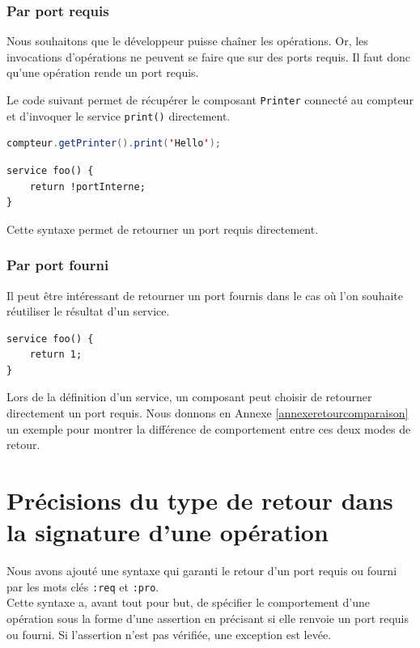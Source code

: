 \documentclass[11pt,a4paper,openany,oneside]{book}
\begin{document}
\subsubsection{Par port requis}
Nous souhaitons que le développeur puisse chaîner les opérations. Or, les invocations d'opérations ne peuvent se faire que sur des ports requis. Il faut donc qu'une opération rende un port requis.

Le code suivant permet de récupérer le composant \texttt{Printer} connecté au compteur et d'invoquer le service \texttt{print()} directement.
\begin{lstlisting}[language=JAVA, frame=single, caption=Syntaxe d'un chaînage d'invocation en COMPO]
compteur.getPrinter().print('Hello');
\end{lstlisting}



\begin{lstlisting}[language=COMPO, frame=single, caption=Syntaxe de retour d'un port requis en COMPO]
service foo() {
    return !portInterne;
}
\end{lstlisting}

Cette syntaxe permet de retourner un port requis directement.


\subsubsection{Par port fourni}
Il peut être intéressant de retourner un port fournis dans le cas où l'on souhaite réutiliser le résultat d'un service.


\begin{lstlisting}[language=COMPO, frame=single, caption=Syntaxe de retour d'un port founis en COMPO]
service foo() {
    return 1;
}
\end{lstlisting}

Lors de la définition d'un service, un composant peut choisir de retourner directement un port requis.
Nous donnons en Annexe \ref{annexeretourcomparaison} un exemple pour montrer la différence de comportement entre ces deux modes de retour.

\section{Précisions du type de retour dans la signature d'une opération}
Nous avons ajouté une syntaxe qui garanti le retour d'un port requis ou fourni par les mots clés \texttt{:req} et \texttt{:pro}.\\
Cette syntaxe a, avant tout pour but, de spécifier le comportement d'une opération sous la forme d'une assertion en précisant si elle renvoie un port requis ou fourni. Si l'assertion n'est pas vérifiée, une exception est levée.
\end{document}
